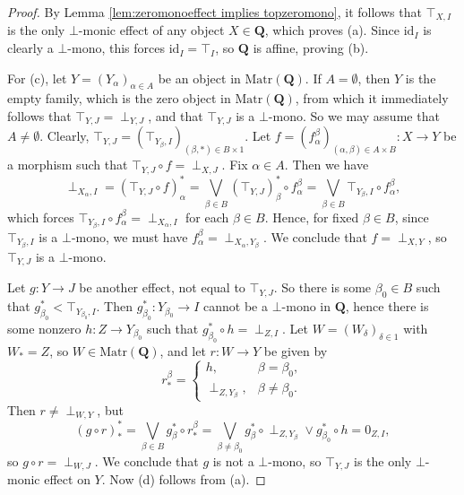 \documentclass[12pt]{tac}
\theoremstyle{definition}
\theoremstyle{remark}
\newcommand{\<}{\langle}
\renewcommand{\>}{\rangle}
\renewcommand{\:}{\colon}
\newcommand{\id}{\mathrm{id}}
\begin{document}
\begin{proof}
  By Lemma \ref{lem:zeromonoeffect implies topzeromono}, it follows that $\top_{X,I}$ is the only $\bot$-monic effect of any object $X\in\mathbf Q$, which proves (a).  Since $\id_I$ is clearly a $\bot$-mono, this forces $\id_I=\top_I$, so $\mathbf Q$ is affine, proving (b). 

  For (c), let $Y=(Y_\alpha)_{\alpha\in A}$ be an object in $\mathrm{Matr}(\mathbf Q)$. If $A=\emptyset$, then $Y$ is the empty family, which is the zero object in $\mathrm{Matr}(\mathbf Q)$, from which it immediately follows that $\top_{Y,J}=\perp_{Y,J}$, and that $\top_{Y,J}$ is a $\bot$-mono. So we may assume that $A\neq\emptyset$.
Clearly, $\top_{Y,J}=(\top_{Y_\beta,I})_{(\beta,*)\in B\times 1}$. Let $f=(f_\alpha^\beta)_{(\alpha,\beta)\in A\times B}:X\to Y$ be a morphism such that $\top_{Y,J}\circ f=\perp_{X,J}$. Fix $\alpha\in A$. Then  we have
\[ \perp_{X_\alpha,I}=(\top_{Y,J}\circ f)_\alpha^*=\bigvee_{\beta\in B}(\top_{Y,J})_\beta^*\circ f_\alpha^\beta=\bigvee_{\beta\in B}\top_{Y_\beta,I}\circ f_\alpha^\beta,\]
which forces $\top_{Y_\beta,I}\circ f_\alpha^\beta=\perp_{X_\alpha,I}$ for each $\beta\in B$. Hence, for fixed $\beta\in B$, since $\top_{Y_\beta,I}$ is a $\bot$-mono, we must have $f_\alpha^\beta=\perp_{X_\alpha,Y_\beta}$. We conclude that $f=\perp_{X,Y}$, so $\top_{Y,J}$ is a $\bot$-mono.

Let $g:Y\to J$ be another effect, not equal to $\top_{Y,J}$. So there is some $\beta_0\in B$ such that $g_{\beta_0}^*<\top_{Y_{\beta_0},I}$. Then $g_{\beta_0}^*:Y_{\beta_0}\to I$ cannot be a $\bot$-mono in $\mathbf Q$, hence there is some nonzero $h:Z\to Y_{\beta_0}$ such that $g_{\beta_0}^*\circ h= \perp_{Z,I}$. Let $W=(W_\delta)_{\delta\in 1}$ with $W_*=Z$, so $W\in\mathrm{Matr}(\mathbf Q)$, and let $r:W\to Y$ be given by \[r_*^{\beta}=\begin{cases}
h, & \beta=\beta_0,\\
\perp_{Z,Y_{\beta}}, & \beta\neq\beta_0. \end{cases}\]
Then $r\neq \perp_{W,Y}$, but \[(g\circ r)_*^*=\bigvee_{\beta\in B}g_\beta^*\circ r_*^\beta=\bigvee_{\beta\neq\beta_0}g_\beta^*\circ \perp_{Z,Y_\beta}\vee g_{\beta_0}^*\circ h=0_{Z,I},\]
so $g\circ r=\perp_{W,J}$. We conclude that $g$ is not a $\bot$-mono, so $\top_{Y,J}$ is the only $\bot$-monic effect on $Y$. Now (d) follows from (a). 
\end{proof}
\end{document}
